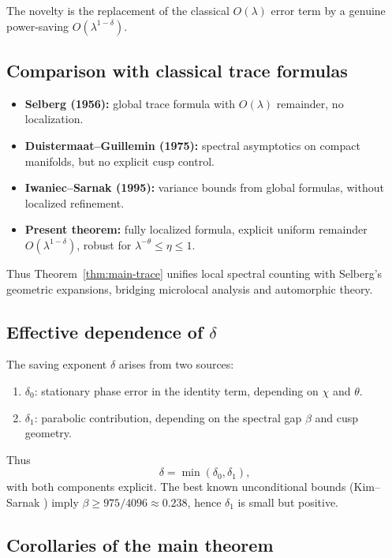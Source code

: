 The novelty is the replacement of the classical $O(\lambda)$ error term by a genuine power-saving $O(\lambda^{1-\delta})$.

\subsection{Comparison with classical trace formulas} \label{subsec:7.2-classical}

\begin{itemize}
  \item \textbf{Selberg (1956):} global trace formula with $O(\lambda)$ remainder, no localization.
  \item \textbf{Duistermaat--Guillemin (1975):} spectral asymptotics on compact manifolds, but no explicit cusp control.
  \item \textbf{Iwaniec--Sarnak (1995):} variance bounds from global formulas, without localized refinement.
  \item \textbf{Present theorem:} fully localized formula, explicit uniform remainder $O(\lambda^{1-\delta})$, robust for $\lambda^{-\theta}\le\eta\le 1$.
\end{itemize}

Thus Theorem~\ref{thm:main-trace} unifies local spectral counting with Selberg’s geometric expansions, bridging microlocal analysis and automorphic theory.

\subsection{Effective dependence of $\delta$} \label{subsec:7.2-delta}

The saving exponent $\delta$ arises from two sources:
\begin{enumerate}
  \item $\delta_0$: stationary phase error in the identity term, depending on $\chi$ and $\theta$.
  \item $\delta_1$: parabolic contribution, depending on the spectral gap $\beta$ and cusp geometry.
\end{enumerate}
Thus
\[
  \delta=\min(\delta_0,\delta_1),
\]
with both components explicit. The best known unconditional bounds (Kim--Sarnak \cite{KimSarnak2003}) imply $\beta\ge 975/4096\approx 0.238$, hence $\delta_1$ is small but positive.

\subsection{Corollaries of the main theorem} \label{subsec:7.2-corollaries}

